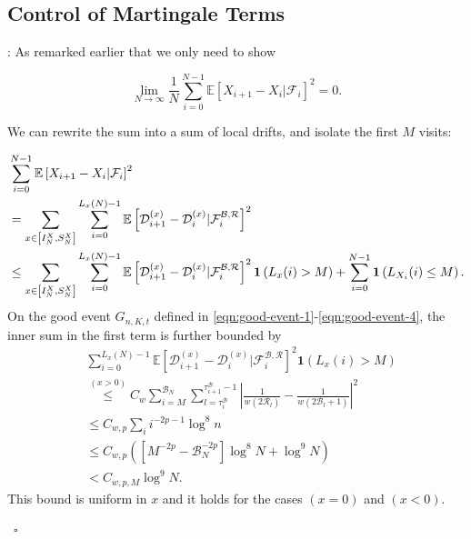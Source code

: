\documentclass[twoside,12pt,a4paper]{article}
\numberwithin{equation}{section}
\newenvironment{proof}[1][Proof]{{\sc #1}:}{~\hfill $\square$}
\begin{document}
	\subsection{Control of Martingale Terms } 
	\begin{proof}[Proof of Lemma~\ref{lm: control of martingale}]
		As remarked earlier that we only need to show
		
		\[
		\lim_{N \to \infty } \frac{1}{N} \sum_{i = 0}^{N-1} \mathbb{E}\left[ X_{i+1} - X_i | \mathcal{F}_i \right]^2 = 0
		.\] 
		
		
		We can rewrite the sum into a sum of local drifts, and isolate the first $M$ visits:
		
		\begin{align}
			&\sum_{i = 0}^{N-1} \mathbb{E}\left[ X_{i+1} - X_i | \mathcal{F}_i \right]^2
			\notag
			\\
			&= \sum_{x \in \left[ I_N^X, S_N^X \right]} \sum_{i = 0}^{L_x(N) - 1} \mathbb{E}\left[ \mathcal{D}_{i+1}^{(x)} - \mathcal{D}_i^{(x)} | \mathcal{F}_{i}^{\mathcal{B}, \mathcal{R}} \right]^2  
			\notag
			\\
			&\le  \sum_{x \in \left[ I_N^X, S_N^X \right]} \sum_{i = 0}^{L_x(N) - 1} \mathbb{E}\left[ \mathcal{D}_{i+1}^{(x)} - \mathcal{D}_i^{(x)} | \mathcal{F}_{i}^{\mathcal{B}, \mathcal{R}} \right]^2 \mathbf{1}\left( L_x(i) > M \right) + 
			\sum_{i = 0}^{N - 1} \mathbf{1}\left( L_{X_i}(i) \le  M \right) 
			\label{eqn:lem-martingale-1}
			.\end{align}
		On the good event $G_{n, K, t}$ defined in \eqref{eqn:good-event-1}-\eqref{eqn:good-event-4},
		the inner sum in the first term is further bounded by
		\begin{align*}
			&\sum_{i =0}^{ L_x(N) - 1} \mathbb{E}\left[ \mathcal{D}_{i+1}^{(x)} - \mathcal{D}_i^{(x)} | \mathcal{F}_{i}^{\mathcal{B}, \mathcal{R}} \right]^2 \mathbf{1}\left( L_{x}(i) > M \right) \\
			&\stackrel{(x > 0)}{\le} C_w \sum_{i = M}^{\mathcal{B}_N} \sum_{l = \tau_i^{\mathcal{B}}}^{\tau_{i+1}^{\mathcal{B}}-1} 
			\left| \frac{1}{w(2 \mathcal{R}_l)} - \frac{1}{w\left( 2 \mathcal{B}_l + 1 \right) } \right|^2 \\
			&\le C_{w, p} \sum_i i^{- 2 p - 1} \log^8 n  \\
			&\le C_{w, p} \left(\left[ M^{- 2 p} - \mathcal{B}_N^{- 2 p} \right] \log^8 N + \log^9 N\right)  \\
			&< C_{w, p, M} \log^9 N
			.
		\end{align*}
		This bound is uniform in $x$ and it holds for the cases $(x=0)$ and $(x < 0)$. 
		

\end{proof}
\end{document}
